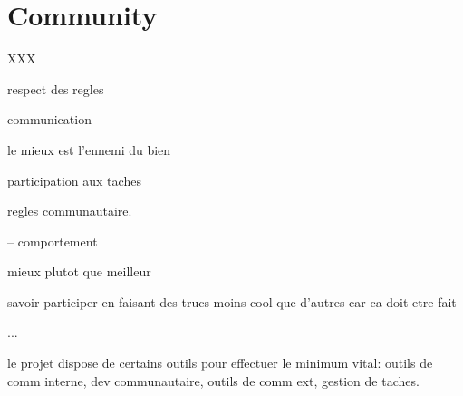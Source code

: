 %
%
%
%
%
%

%
%

\chapter{Community}

XXX

\newpage

%
%

respect des regles

communication

le mieux est l'ennemi du bien

participation aux taches

%
%

regles communautaire.

-- comportement

mieux plutot que meilleur

savoir participer en faisant des trucs moins cool que d'autres car ca
doit etre fait

...

le projet dispose de certains outils pour effectuer le minimum vital:
outils de comm interne, dev communautaire, outils de comm ext, gestion
de taches.


